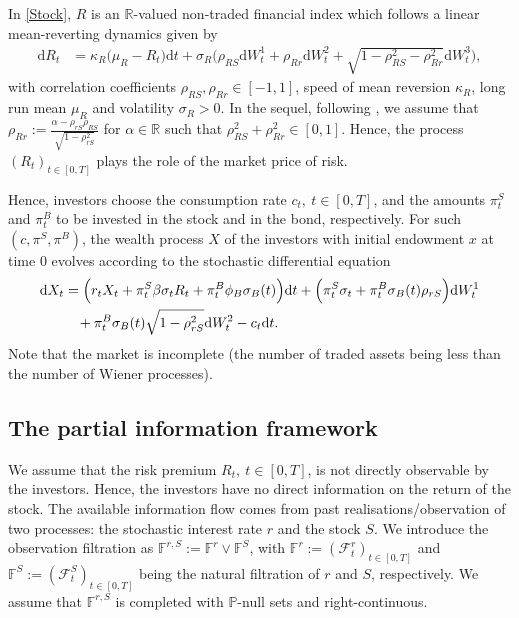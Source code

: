 \documentclass[12,reqno]{amsart}
\numberwithin{equation}{section}
\begin{document}
In \eqref{Stock}, $R$ is an $\mathbb{R}$-valued non-traded financial index which follows a linear mean-reverting dynamics given by
\begin{align}\label{Risk premium}
	\mathrm{d}R_{t}&=\kappa_{R}\big(\mu_{R}-R_{t}\big)\mathrm{d}t+\sigma_{R}\Big(\rho_{RS}\mathrm{d}W_{t}^{1}+\rho_{Rr}\mathrm{d}W_{t}^{2}+\sqrt{1-\rho_{RS}^{2}-\rho_{Rr}^{2}}\mathrm{d}W_{t}^{3}\Big),
\end{align}
with correlation coefficients $\rho_{RS},\rho_{Rr}\in[-1,1]$, speed of mean reversion $\kappa_{R}$, long run mean $\mu_{R}$ and volatility $\sigma_{R}>0$. In the sequel, following \cite{escobar2016portfolio}, we assume that $\rho_{Rr}:=\frac{\alpha-\rho_{rS}\rho_{RS}}{\sqrt{1-\rho_{rS}^{2}}}$ for $\alpha\in\mathbb{R}$ such that $\rho_{RS}^{2}+\rho_{Rr}^{2}\in[0,1]$. Hence, the process $(R_{t})_{t\in[0,T]}$ plays the role of the market price of risk.

Hence, investors choose the consumption rate $c_{t},~t\in[0,T]$, and the amounts $\pi_{t}^{S}$ and $\pi_{t}^{B}$ to be invested in the stock and in the bond, respectively. For such $(c,\pi^{S},\pi^{B})$, the wealth process $X$ of the investors with initial endowment $x$ at time $0$ evolves according to the stochastic differential equation
\begin{align}\label{Wealth}
	\mathrm{d}X_{t}&=\Big(r_{t}X_{t}+\pi_{t}^{S}\beta\sigma_{t}R_{t}+\pi_{t}^{B}\phi_{B}\sigma_{B}(t)\Big)\mathrm{d}t+\Big(\pi_{t}^{S}\sigma_{t}+\pi_{t}^{B}\sigma_{B}(t)\rho_{rS}\Big)\mathrm{d}W_{t}^{1}\notag\\
	&\phantom{X}+\pi_{t}^{B}\sigma_{B}(t)\sqrt{1-\rho_{rS}^{2}}\mathrm{d}W_{t}^{2}-c_{t}\mathrm{d}t.
\end{align}
Note that the market is incomplete (the number of traded assets being less than the number of Wiener processes).

\subsection{The partial information framework}\label{The partial information framework}
We assume that the risk premium $R_{t},~t\in[0,T]$, is not directly observable by the investors. Hence, the investors have no direct information on the return of the stock. The available information flow comes from past realisations/observation of two processes: the stochastic interest rate $r$ and the stock $S$. We
introduce the observation filtration as $\mathbb{F}^{r,S}:=\mathbb{F}^{r}\vee\mathbb{F}^{S}$, with $\mathbb{F}^{r}:=(\mathcal{F}_{t}^{r})_{t\in[0,T]}$ and $\mathbb{F}^{S}:=(\mathcal{F}_{t}^{S})_{t\in[0,T]}$ being the natural filtration of $r$ and $S$, respectively. We assume that $\mathbb{F}^{r,S}$ is completed with $\mathbb{P}$-null sets and right-continuous.
\end{document}
